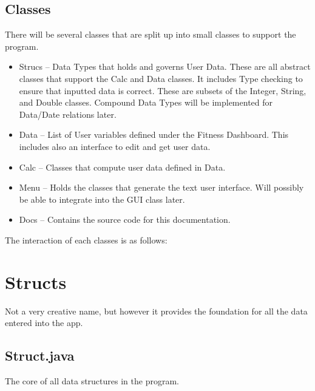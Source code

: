 \documentclass{book}
\newcommand{\code}[1]{#1}
\newcommand{\object}[2]{\item[\textbf{#1}\ : \textit{#2}]}
\begin{document}
\section{Classes}
There will be several classes that are split up into small classes to support the program.
\begin{itemize}
	\item Strucs -- Data Types that holds and governs User Data. These are all abstract classes that support the Calc and Data classes. It includes Type checking to ensure that inputted data is correct. These are subsets of the Integer, String, and Double classes. Compound Data Types will be implemented for Data/Date relations later.
	\item Data -- List of User variables defined under the Fitness Dashboard. This includes also an interface to edit and get user data.
	\item Calc -- Classes that compute user data defined in Data.
	\item Menu -- Holds the classes that generate the text user interface. Will possibly be able to integrate into the GUI class later.
	\item Docs -- Contains the source code for this documentation.
\end{itemize}
The interaction of each classes is as follows: \\
\begin{center}
\end{center}

\chapter{Structs}
Not a very creative name, but however it provides the foundation for all the data entered into the app.
\section{\code{Struct.java}}
The core of all data structures in the program.
\begin{comment}
\begin{itemize} 
	\object{Struct\_Entry}{Object} Holds all the values of the data.
	\object{Struct\_Type}{String} What is the characteristic that describes the object. E.g. Weight, Height, etc.
	\object{Struct\_Units}{String} The units of the type.
	\object{Struct\_Lock}{Boolean} Locks the type and units of the data from modification.
	\item[] \\
	\constructor{Struct}{
\end{itemize}
\end{comment}
\end{document}
